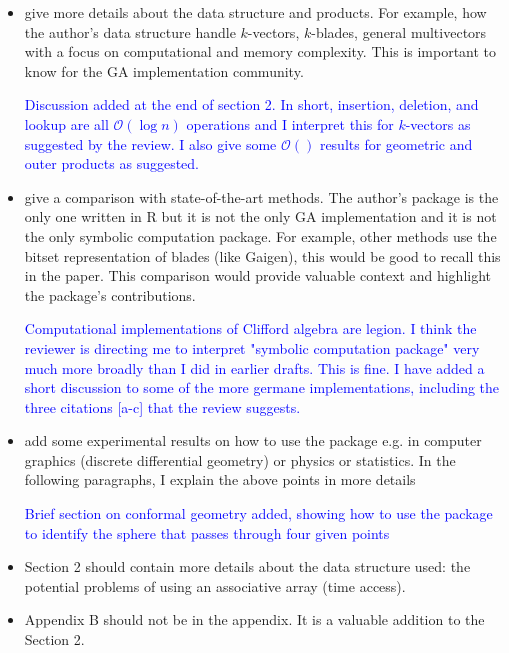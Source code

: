 \documentclass{article}
\begin{document}
\begin{itemize}
\item give more details about the data structure and products.  For
  example, how the author's data structure handle $k$-vectors,
  $k$-blades, general multivectors with a focus on computational and
  memory complexity.  This is important to know for the GA
  implementation community.

\textcolor{blue}{Discussion added at the end of section 2.  In short,
  insertion, deletion, and lookup are all $\mathcal{O}(\log n)$
  operations and I interpret this for $k$-vectors as suggested by the
  review.  I also give some $\mathcal{O}()$ results for geometric and
  outer products as suggested.}

\item give a comparison with state-of-the-art methods.  The author's
  package is the only one written in R but it is not the only GA
  implementation and it is not the only symbolic computation
  package.  For example, other methods use the bitset representation of
  blades (like Gaigen), this would be good to recall this in the
  paper.  This comparison would provide valuable context and highlight
  the package's contributions.

\textcolor{blue}{Computational implementations of Clifford algebra are
  legion.  I think the reviewer is directing me to interpret "symbolic
  computation package" very much more broadly than I did in earlier
  drafts.  This is fine.  I have added a short discussion to some of
  the more germane implementations, including the three citations
  [a-c] that the review suggests.}
  
\item add some experimental results on how to use the package e.g. in
  computer graphics (discrete differential geometry) or physics or
  statistics.  In the following paragraphs, I explain the above points
  in more details

\textcolor{blue}{Brief section on conformal geometry added, showing
  how to use the package to identify the sphere that passes through
  four given points}

\item Section 2 should contain more details about the data structure
  used: the potential problems of using an associative array (time
  access).

\item Appendix B should not be in the appendix.  It is a valuable
  addition to the Section 2.


\end{itemize}
\end{document}
